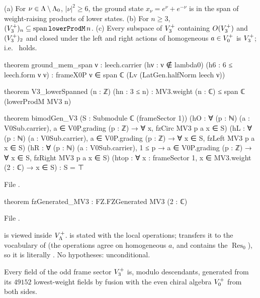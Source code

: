 \begin{theorem}\label{ch14:thm:bimodgen}
(a) For $\nu\in{\Lambda}\setminus{\Lambda}_0$, $|\nu|^2\ge6$, the ground state $x_\nu=e^\nu+e^{-\nu}$ is in the span of
weight-raising products of lower states.  (b) For $n\ge3$, $(\chXIVB)_n\subseteq\operatorname{span}\lean{lowerProdM}\,n$.
(c) Every subspace of $V_3^{+}$ containing $O(V_3^{+})$ and $(V_3^{+})_2$ and closed under the left and right
actions of homogeneous $a\in V_0^{+}$ is $V_3^{+}$; i.e.\  holds.
\end{theorem}
\begin{leancode}
theorem ground_mem_span {ν : leech.carrier} (hν : ν ∉ lambda0) (h6 : 6 ≤ leech.form ν ν) :
    frameX0P ν ∈ span ℂ (Lv (LatGen.halfNorm leech ν))

theorem V3_lowerSpanned (n : ℤ) (hn : 3 ≤ n) :
    MV3.weight (n : ℂ) ≤ span ℂ (lowerProdM MV3 n)

theorem bimodGen_V3 (S : Submodule ℂ (frameSector 1))
    (hO : ∀ (p : ℕ) (a : V0Sub.carrier), a ∈ V0P.grading (p : ℤ) → ∀ x, fzCirc MV3 p a x ∈ S)
    (hL : ∀ (p : ℕ) (a : V0Sub.carrier), a ∈ V0P.grading (p : ℤ) → ∀ x ∈ S, fzLeft MV3 p a x ∈ S)
    (hR : ∀ (p : ℕ) (a : V0Sub.carrier), 1 ≤ p → a ∈ V0P.grading (p : ℤ) → ∀ x ∈ S,
      fzRight MV3 p a x ∈ S)
    (htop : ∀ x : frameSector 1, x ∈ MV3.weight (2 : ℂ) → x ∈ S) : S = ⊤
\end{leancode}
File .
\begin{leancode}
theorem fzGenerated_MV3 : FZ.FZGenerated MV3 (2 : ℂ)
\end{leancode}
File .

\begin{dictionary}
 is  viewed inside $V_{\Lambda}^+$.   is stated with the local
operations;  transfers it to the vocabulary of  (the operations agree
on homogeneous $a$, and  contains the $\operatorname{Res}_0$), so it is literally .
No hypotheses: unconditional.
\end{dictionary}

\begin{physics}
Every field of the odd frame sector $V_3^{+}$ is, modulo descendants, generated from its
$49152$ lowest-weight fields by fusion with the even chiral algebra $V_0^{+}$ from both sides.
\end{physics}

